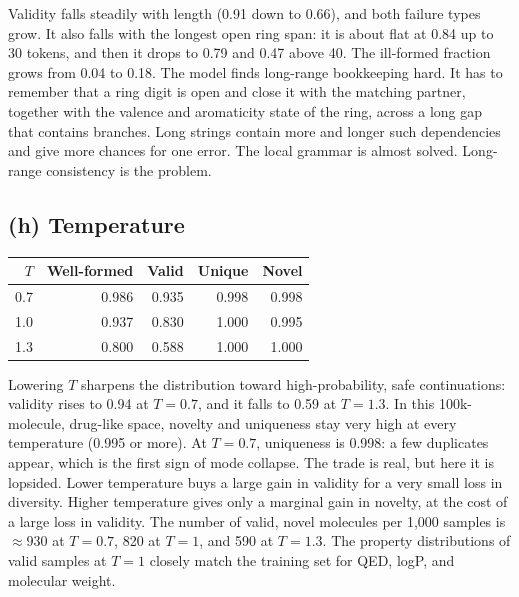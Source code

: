 \documentclass[11pt]{article}
\begin{document}
Validity falls steadily with length (0.91 down to 0.66), and both failure types
grow. It also falls with the longest open ring span: it is about flat at 0.84 up to 30 tokens,
and then it drops to 0.79 and 0.47 above 40. The ill-formed fraction grows from 0.04 to 0.18.
The model finds long-range bookkeeping hard. It has to remember that a ring
digit is open and close it with the matching partner, together with the valence and aromaticity
state of the ring, across a long gap that contains branches. Long strings contain
more and longer such dependencies and give more chances for one error. The
local grammar is almost solved. Long-range consistency is the problem.

\subsection*{(h) Temperature}

\begin{table}[H]\centering
\begin{tabular}{rrrrr}\toprule
$T$ & Well-formed & Valid & Unique & Novel\\\midrule
0.7 & 0.986 & 0.935 & 0.998 & 0.998\\
1.0 & 0.937 & 0.830 & 1.000 & 0.995\\
1.3 & 0.800 & 0.588 & 1.000 & 1.000\\\bottomrule
\end{tabular}\end{table}

Lowering $T$ sharpens the distribution toward high-probability, safe
continuations: validity rises to 0.94 at $T=0.7$, and it falls to 0.59 at $T=1.3$.
In this 100k-molecule, drug-like space, novelty and uniqueness stay very high at every
temperature (0.995 or more). At $T=0.7$, uniqueness is 0.998: a few duplicates appear, which is the first sign
of mode collapse. The trade is real, but here it is lopsided. Lower temperature buys
a large gain in validity for a very small loss in diversity. Higher temperature
gives only a marginal gain in novelty, at the cost of a large loss in validity.
The number of valid, novel molecules per 1{,}000 samples is
$\approx 930$ at $T=0.7$, 820 at $T=1$, and 590 at $T=1.3$. The property distributions of valid samples at
$T=1$ closely match the training set for QED, logP, and molecular weight.
\end{document}
